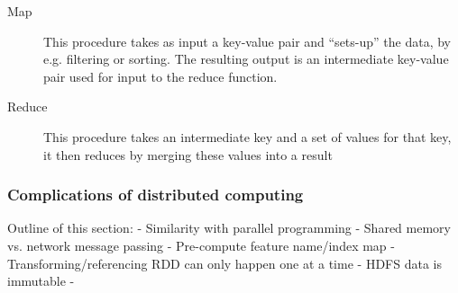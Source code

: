 \begin{description}
    \item[Map] This procedure takes as input a key-value pair and ``sets-up'' the data, by e.g. filtering or sorting. The resulting output is an intermediate key-value pair used for input to the reduce function.
    \item[Reduce] This procedure takes an intermediate key and a set of values for that key, it then reduces by merging these values into a result
\end{description}

\subsubsection{Complications of distributed computing}

Outline of this section:
- Similarity with parallel programming
    - Shared memory vs. network message passing
- Pre-compute feature name/index map
- Transforming/referencing RDD can only happen one at a time
- HDFS data is immutable
- 





